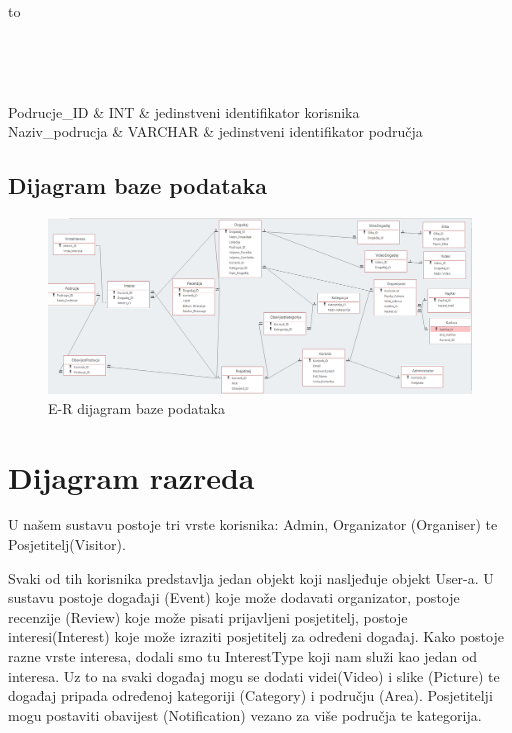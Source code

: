 	\begin{longtabu} to \textwidth {|X[8, l]|X[6, l]|X[20, l]|}
		
		\hline {}	 \\[3pt] \hline
		\endfirsthead
		
		\hline {}	 \\[3pt] \hline
		\endhead
		
		\hline 
		\endlastfoot
		
		Podrucje\_ID & INT	&  	jedinstveni identifikator korisnika	\\ \hline
		Naziv\_podrucja	& VARCHAR &  jedinstveni identifikator područja	\\ \hline 
		
		
	\end{longtabu}
	
	\subsection{Dijagram baze podataka}
	\begin{figure}[H]
		\includegraphics[scale=0.46]{slike/ERModel2.PNG}
		\centering
		\caption{E-R dijagram baze podataka}
		\label{fig:promjene}
	\end{figure}
	
	\eject
			
			
		\section{Dijagram razreda}
		
		\normalfont U našem sustavu postoje tri vrste korisnika: Admin, Organizator (Organiser) te Posjetitelj(Visitor).
		
		\normalfont\noindent Svaki od tih korisnika predstavlja jedan objekt koji nasljeđuje objekt User-a. U sustavu postoje događaji (Event)  koje može dodavati organizator, postoje recenzije (Review) koje može pisati prijavljeni posjetitelj, postoje interesi(Interest) koje može izraziti posjetitelj za određeni događaj. Kako postoje razne vrste interesa, dodali smo tu InterestType koji nam služi kao jedan od interesa. Uz to na svaki događaj mogu se dodati videi(Video) i slike (Picture) te događaj pripada određenoj kategoriji (Category) i području (Area).  Posjetitelji mogu postaviti obavijest (Notification) vezano za više područja te kategorija.
		
